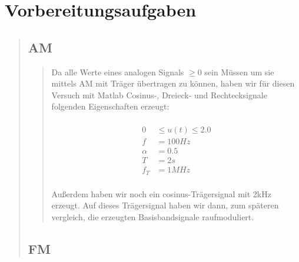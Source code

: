 %     





\section{Vorbereitungsaufgaben}
\begin{quote}
    \hspace{-2em}
    \subsection{AM}
        
    \begin{quote}
        
        Da alle Werte eines analogen Signals $\geq 0$ sein Müssen um sie mittels AM mit Träger übertragen zu können, haben wir für
        diesen Versuch mit Matlab Cosinus-, Dreieck- und Rechtecksignale folgenden Eigenschaften erzeugt:
        
        
        \begin{equation*}
        \begin{split}
        \\
                 0 &\leq u(t) \leq 2.0
        \\
                 f &= \si{100}{Hz}
        \\
            \alpha &= 0.5
        \\
                 T &= \si{2}{s}
        \\
               f_T &= \si{1}{MHz}
        \\
        \end{split}
        \end{equation*}
        
        
        Außerdem haben wir noch ein cosinus-Trägersignal mit \si{2}{kHz} erzeugt. Auf dieses Trägersignal haben wir dann, zum
        späteren vergleich, die erzeugten Basisbandsignale raufmoduliert.
        
    \end{quote}
    
    
    
    
    \subsection{FM}
    \begin{quote}
        

\end{quote}
\end{quote}
